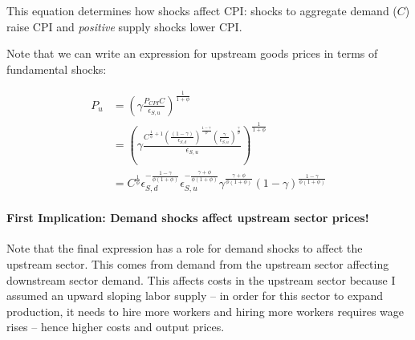 \documentclass[12pt,english]{article}
\begin{document}
This equation determines how shocks affect CPI: shocks to aggregate demand ($C$) raise CPI and \emph{positive} supply shocks lower CPI.

Note that we can write an expression for upstream goods prices in terms of fundamental shocks: %

\begin{align*}
	P_u&=\left(\gamma \frac{P_{CPI} C}{\epsilon_{S,u}}\right)^{\frac{1}{1+\phi}}\\
	&=	\left(\gamma \frac{C^{\frac{1}{\phi}+1}\left(\frac{(1-\gamma)}{\epsilon_{S,d}}\right)^{\frac{1-\gamma}{\phi}}\left(\frac{\gamma}{\epsilon_{S,u}}\right)^{\frac{\gamma}{\phi}}}{\epsilon_{S,u}}\right)^{\frac{1}{1+\phi}}\\
	&=C^{\frac{1}{\phi}} \epsilon_{S,d}^{-\frac{1-\gamma}{\phi(1+\phi)}}\epsilon_{S,u}^{-\frac{\gamma+\phi}{\phi(1+\phi)}}\gamma^{\frac{\gamma+\phi}{\phi(1+\phi)}}(1-\gamma)^{\frac{1-\gamma}{\phi(1+\phi)}}
\end{align*}

\paragraph{First Implication: Demand shocks affect upstream sector prices!}

Note that the final expression has a role for demand shocks to affect the upstream sector. This comes from demand from the upstream sector affecting downstream sector demand. This affects costs in the upstream sector because I assumed an upward sloping labor supply -- in order for this sector to expand production, it needs to hire more workers and hiring more workers requires wage rises -- hence higher costs and output prices.
\end{document}
